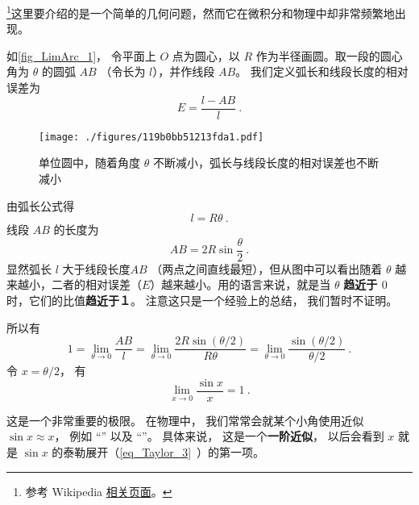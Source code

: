 

\footnote{参考 Wikipedia \href{https://en.wikipedia.org/wiki/Small-angle_approximation}{相关页面}。}这里要介绍的是一个简单的几何问题，然而它在微积分和物理中却非常频繁地出现。

如\autoref{fig_LimArc_1}， 令平面上 $O$ 点为圆心，以 $R$ 作为半径画圆。取一段的圆心角为 $\theta $ 的圆弧 $AB$ （令长为 $l$），并作线段 $AB$。 我们定义弧长和线段长度的相对误差为
\begin{equation}
E = \frac{l - AB}{l}~.
\end{equation}

\begin{figure}[ht]
\centering
\texttt{[image: ./figures/119b0bb51213fda1.pdf]}
\caption{单位圆中，随着角度 $\theta$ 不断减小，弧长与线段长度的相对误差也不断减小}\label{fig_LimArc_1}
\end{figure}

由弧长公式得
\begin{equation} \label{eq_LimArc_1}
l = R\theta ~.
\end{equation}
线段 $AB$ 的长度为
\begin{equation}\label{eq_LimArc_2}
AB = 2R\sin \frac{\theta }{2}~.
\end{equation}
显然弧长 $l$ 大于线段长度$AB$ （两点之间直线最短），但从图中可以看出随着 $\theta $ 越来越小，二者的相对误差（$E$）越来越小。用的语言来说，就是当 $\theta $ \textbf{趋近于 $0$ } 时，它们的比值\textbf{趋近于１}。 注意这只是一个经验上的总结， 我们暂时不证明。

所以有
\begin{equation}
1=\lim_{\theta\to 0} \frac{AB}{l} = \lim_{\theta\to 0} \frac{2R\sin (\theta/2)}{R\theta} 
= \lim_{\theta\to 0}\frac{\sin (\theta/2)}{\theta/2}~.
\end{equation}
令 $x = \theta/2$， 有
\begin{equation}
\lim_{x\to 0} \frac{\sin x}{x} = 1~.
\end{equation}

这是一个非常重要的极限。 在物理中， 我们常常会就某个小角使用近似 $\sin x \approx x$， 例如 “” 以及 “”。 具体来说， 这是一个\textbf{一阶近似}，  以后会看到 $x$ 就是 $\sin x$ 的泰勒展开（\autoref{eq_Taylor_3}~）的第一项。

